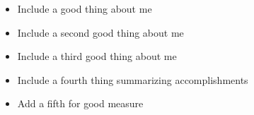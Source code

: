 \begin{center}
\begin{itemize}
	\item Include a good thing about me
	\item Include a second good thing about me
	\item Include a third good thing about me
	\item Include a fourth thing summarizing accomplishments
	\item Add a fifth for good measure
\end{itemize}
\end{center}
